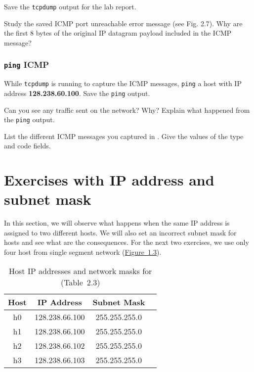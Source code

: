 \documentclass{../UTNetLab}
\begin{document}
    Save the \lstinline{tcpdump} output for the lab report.

    \begin{report}
    \item Study the saved ICMP port unreachable error message (see Fig. 2.7).
    Why are the first 8 bytes of the original IP datagram payload included in the ICMP message?
    \end{report}

\section{\texttt{ping} ICMP}
    While \lstinline{tcpdump} is running to capture the ICMP messages, \lstinline{ping} a host with IP address \textbf{128.238.60.100}. Save the \lstinline{ping} output.
    
    \begin{report}
    \item Can you see any traffic sent on the network? Why? Explain what happened from the \lstinline{ping} output.

    \item List the different ICMP messages you captured in . Give the values of the type and code fields.
    \end{report}

\part{Exercises with IP address and subnet mask}
    In this section, we will observe what happens when the same IP address is assigned to two different hosts.
    We will also set an incorrect subnet mask for hosts and see what are the consequences.
    For the next two exercises, we use only four host from single segment network (\hyperref[fig:1.3]{Figure~1.3}).

    \begin{table}[H]
        \caption{Host IP addresses and network masks for  (Table~2.3)}\label{tab:2.3}
        \centering
        \begin{tabular}{ c c c c }
            \hline \hline
            Host & IP Address & Subnet Mask \\
            \hline 
            h0 & 128.238.66.100 & 255.255.255.0 \\
            h1 & 128.238.66.100 & 255.255.255.0 \\
            h2 & 128.238.66.102 & 255.255.255.0 \\
            h3 & 128.238.66.103 & 255.255.255.0 \\
            \hline \hline
            \end{tabular}
    \end{table}
\end{document}
